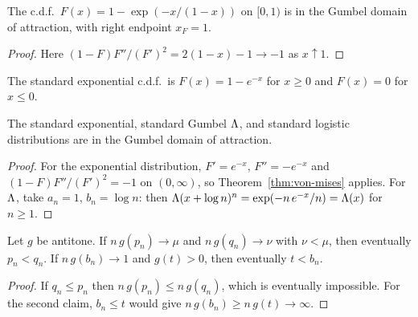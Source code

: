 \begin{proposition}
  \label{prop:exp-neg-inv-gumbel}
  \leanok
  The c.d.f.\ $F(x) = 1 - \exp(-x/(1-x))$ on $[0, 1)$ is in the Gumbel domain of attraction,
  with right endpoint $x_F = 1$.
\end{proposition}
\begin{proof}
  \leanok
  Here $(1-F)F''/(F')^2 = 2(1-x) - 1 \to -1$ as $x \uparrow 1$.
\end{proof}

\begin{definition}
  \label{def:std-exponential-cdf}
  \leanok
  The standard exponential c.d.f.\ is $F(x) = 1 - e^{-x}$ for $x \ge 0$ and $F(x) = 0$ for
  $x \le 0$.
\end{definition}

\begin{proposition}
  \label{prop:mda-gumbel-examples}
  \leanok
  The standard exponential, standard Gumbel $\Lambda$, and standard logistic distributions are in
  the Gumbel domain of attraction.
\end{proposition}
\begin{proof}
  \leanok
  For the exponential distribution, $F' = e^{-x}$, $F'' = -e^{-x}$ and
  $(1 - F) F''/(F')^2 = -1$ on $(0, \infty)$, so Theorem~\ref{thm:von-mises} applies. For
  $\Lambda$, take $a_n = 1$, $b_n = \log n$: then $\Lambda(x + \log n)^n =
  \exp(-n \, e^{-x}/n) = \Lambda(x)$ for $n \ge 1$.
\end{proof}

\begin{lemma}
  \label{lem:gumbel-eventually-lt}
  \leanok
  Let $g$ be antitone. If $n \, g(p_n) \to \mu$ and $n \, g(q_n) \to \nu$ with $\nu < \mu$, then
  eventually $p_n < q_n$. If $n \, g(b_n) \to 1$ and $g(t) > 0$, then eventually $t < b_n$.
\end{lemma}
\begin{proof}
  \leanok
  If $q_n \le p_n$ then $n \, g(p_n) \le n \, g(q_n)$, which is eventually impossible. For the
  second claim, $b_n \le t$ would give $n \, g(b_n) \ge n \, g(t) \to \infty$.
\end{proof}

